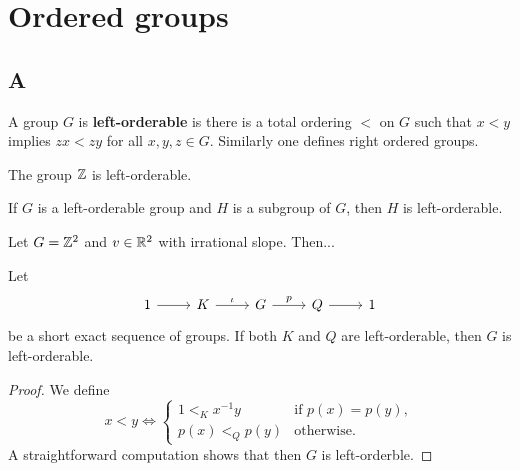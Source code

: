 \chapter{Ordered groups}



\section*{A}

A group $G$ is \textbf{left-orderable} is there is a total ordering $<$ on $G$ 
such that $x<y$ implies $zx<zy$ for all $x,y,z\in G$. Similarly one
defines right ordered groups. 

\begin{example}
The group $\mathbb{Z}$ is left-orderable. 
\end{example}

\begin{example}
	If $G$ is a left-orderable group and $H$ is a subgroup of $G$, then $H$ is left-orderable.
\end{example}

\begin{example}
	Let $G=\mathbb{Z}^2$ and $v\in\mathbb{R}^2$ with irrational slope. Then...
\end{example}

\begin{proposition}
Let 
\[
\begin{tikzcd}
	1 & K & G & Q & 1
	\arrow[from=1-1, to=1-2]
	\arrow["\iota", from=1-2, to=1-3]
	\arrow["p", from=1-3, to=1-4]
	\arrow[from=1-4, to=1-5]
\end{tikzcd}
\]
be a short exact sequence of groups. 
If both $K$ and $Q$ are left-orderable, then $G$ is left-orderable. 
\end{proposition}

\begin{proof}
	We define 
	\[
	x<y\Longleftrightarrow
	\begin{cases}
		1<_Kx^{-1}y & \text{if $p(x)=p(y)$},\\
		p(x)<_Qp(y) & \text{otherwise}.		
	\end{cases}
	\]
	A straightforward computation shows that then $G$ is left-orderble. 
\end{proof}

